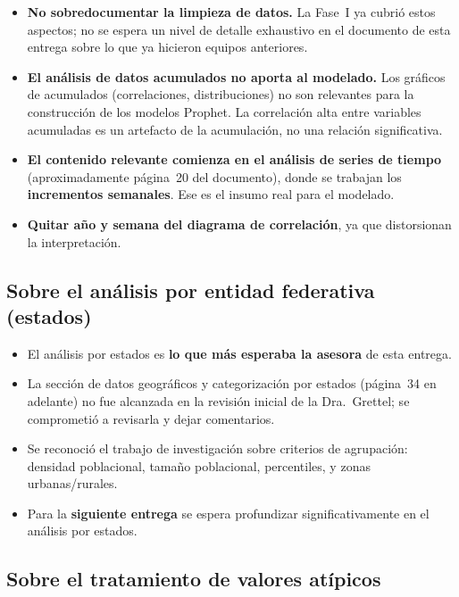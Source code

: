\documentclass[11pt, a4paper]{article}
\begin{document}
\begin{itemize}[leftmargin=1.5em]
    \item \textbf{No sobredocumentar la limpieza de datos.} La Fase~I ya cubrió estos aspectos; no se espera un nivel de detalle exhaustivo en el documento de esta entrega sobre lo que ya hicieron equipos anteriores.
    \item \textbf{El análisis de datos acumulados no aporta al modelado.} Los gráficos de acumulados (correlaciones, distribuciones) no son relevantes para la construcción de los modelos Prophet. La correlación alta entre variables acumuladas es un artefacto de la acumulación, no una relación significativa.
    \item \textbf{El contenido relevante comienza en el análisis de series de tiempo} (aproximadamente página~20 del documento), donde se trabajan los \textbf{incrementos semanales}. Ese es el insumo real para el modelado.
    \item \textbf{Quitar año y semana del diagrama de correlación}, ya que distorsionan la interpretación.
\end{itemize}

\subsection{Sobre el análisis por entidad federativa (estados)}

\begin{itemize}[leftmargin=1.5em]
    \item El análisis por estados es \textbf{lo que más esperaba la asesora} de esta entrega.
    \item La sección de datos geográficos y categorización por estados (página~34 en adelante) no fue alcanzada en la revisión inicial de la Dra.\ Grettel; se comprometió a revisarla y dejar comentarios.
    \item Se reconoció el trabajo de investigación sobre criterios de agrupación: densidad poblacional, tamaño poblacional, percentiles, y zonas urbanas/rurales.
    \item Para la \textbf{siguiente entrega} se espera profundizar significativamente en el análisis por estados.
\end{itemize}

\subsection{Sobre el tratamiento de valores atípicos}
\end{document}
